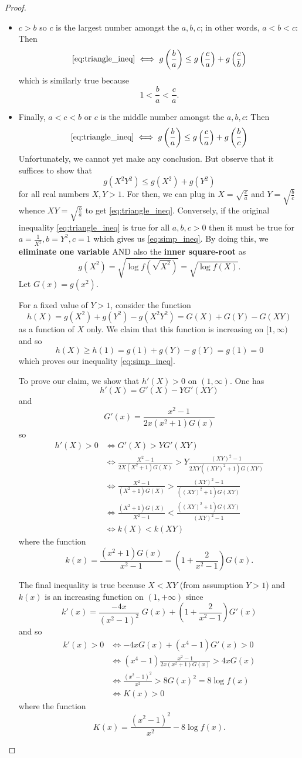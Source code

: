 \documentclass[10pt]{amsart}
\begin{document}
\begin{proof}
\begin{itemize}
\item $c > b$ so $c$ is the largest number amongst the $a, b, c$; in other words, $a < b < c$: Then
$$\eqref{eq:triangle_ineq} \iff g\left(\frac{b}{a}\right) \leq g\left(\frac{c}{a}\right) + g\left(\frac{c}{b}\right)$$
which is similarly true because
$$1 < \frac{b}{a} < \frac{c}{a}.$$

\item Finally, $a < c < b$ or $c$ is the middle number amongst the $a, b, c$: Then
$$\eqref{eq:triangle_ineq} \iff g\left(\frac{b}{a}\right) \leq g\left(\frac{c}{a}\right) + g\left(\frac{b}{c}\right)$$
Unfortunately, we cannot yet make any conclusion. But observe that it suffices to show that
\begin{equation}
g(X^2 Y^2) \leq g(X^2) + g(Y^2)
\label{eq:simp_ineq}
\end{equation}
for all real numbers $X, Y > 1$. For then, we can plug in $X = \sqrt{\frac{c}{a}}$ and $Y = \sqrt{\frac{b}{c}}$ whence $XY = \sqrt{\frac{b}{a}}$ to get \eqref{eq:triangle_ineq}. Conversely, if the original inequality \eqref{eq:triangle_ineq} is true for all $a, b, c > 0$ then it must be true for $a = \frac{1}{X^2}, b = Y^2, c = 1$ which gives us \eqref{eq:simp_ineq}. By doing this, we \textbf{eliminate one variable} AND also the \textbf{inner square-root} as
$$g(X^2) = \sqrt{\log f(\sqrt{X^2})} = \sqrt{\log f(X)}.$$
Let $G(x) = g(x^2)$.

For a fixed value of $Y > 1$, consider the function
$$h(X) = g(X^2) + g(Y^2) - g(X^2Y^2) = G(X) + G(Y) - G(XY)$$
as a function of $X$ only. We claim that this function is increasing on $[1, \infty)$ and so
$$h(X) \geq h(1) = g(1) + g(Y) - g(Y) = g(1) = 0$$
which proves our inequality \eqref{eq:simp_ineq}.

To prove our claim, we show that $h'(X) > 0$ on $(1, \infty)$. One has
$$h'(X) = G'(X) - Y G'(XY)$$
and
$$G'(x) = \frac{x^2 - 1}{2 x (x^2 + 1) G(x)}$$
so
\begin{align*}
h'(X) > 0 &\iff G'(X) > Y G'(XY)\\
&\iff \frac{X^2 - 1}{2 X (X^2 + 1) G(X)} > Y \frac{(XY)^2 - 1}{2 XY ((XY)^2 + 1) G(XY)}\\
&\iff \frac{X^2 - 1}{(X^2 + 1) G(X)} > \frac{(XY)^2 - 1}{((XY)^2 + 1) G(XY)}\\
&\iff \frac{(X^2 + 1) G(X)}{X^2 - 1} < \frac{((XY)^2 + 1) G(XY)}{(XY)^2 - 1}\\
&\iff k(X) < k(XY)
\end{align*}
where the function
$$k(x) = \frac{(x^2 + 1) G(x)}{x^2 - 1} = \left(1 + \frac{2}{x^2 - 1}\right) G(x).$$

The final inequality is true because $X < XY$ (from assumption $Y > 1$) and $k(x)$ is an increasing function on $(1, +\infty)$ since
$$k'(x) = \frac{-4x}{(x^2 - 1)^2} \; G(x) + \left(1 + \frac{2}{x^2 - 1}\right) G'(x)$$
and so
\begin{align*}
k'(x) > 0 &\iff -4x G(x) + (x^4 - 1) G'(x) > 0\\
&\iff (x^4 - 1) \frac{x^2 - 1}{2 x (x^2 + 1) G(x)} > 4x G(x)\\
&\iff \frac{(x^2 - 1)^2}{x^2} > 8 G(x)^2 = 8 \log f(x)\\
&\iff K(x) > 0
\end{align*}
where the function
$$K(x) = \frac{(x^2 - 1)^2}{x^2} - 8 \log f(x).$$


\end{itemize}
\end{proof}
\end{document}
